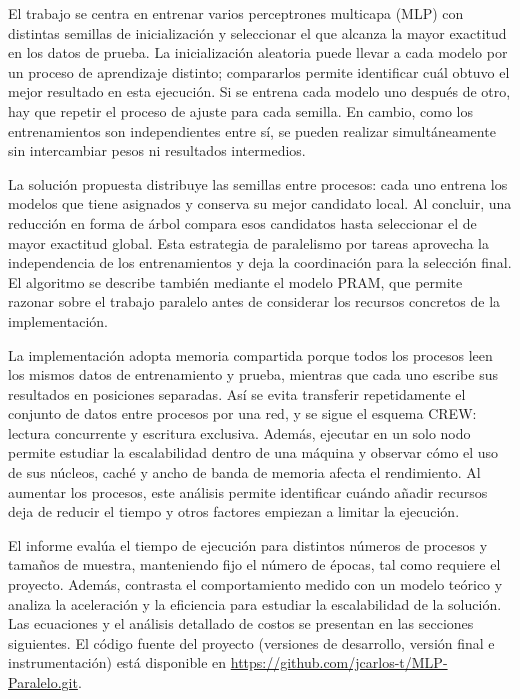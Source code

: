 \documentclass[11pt, a4paper]{article}
\begin{document}
El trabajo se centra en entrenar varios perceptrones multicapa (MLP) con distintas semillas de inicialización y seleccionar el que alcanza la mayor exactitud en los datos de prueba. La inicialización aleatoria puede llevar a cada modelo por un proceso de aprendizaje distinto; compararlos permite identificar cuál obtuvo el mejor resultado en esta ejecución. Si se entrena cada modelo uno después de otro, hay que repetir el proceso de ajuste para cada semilla. En cambio, como los entrenamientos son independientes entre sí, se pueden realizar simultáneamente sin intercambiar pesos ni resultados intermedios.

La solución propuesta distribuye las semillas entre procesos: cada uno entrena los modelos que tiene asignados y conserva su mejor candidato local. Al concluir, una reducción en forma de árbol compara esos candidatos hasta seleccionar el de mayor exactitud global. Esta estrategia de paralelismo por tareas aprovecha la independencia de los entrenamientos y deja la coordinación para la selección final. El algoritmo se describe también mediante el modelo PRAM, que permite razonar sobre el trabajo paralelo antes de considerar los recursos concretos de la implementación.

La implementación adopta memoria compartida porque todos los procesos leen los mismos datos de entrenamiento y prueba, mientras que cada uno escribe sus resultados en posiciones separadas. Así se evita transferir repetidamente el conjunto de datos entre procesos por una red, y se sigue el esquema CREW: lectura concurrente y escritura exclusiva. Además, ejecutar en un solo nodo permite estudiar la escalabilidad dentro de una máquina y observar cómo el uso de sus núcleos, caché y ancho de banda de memoria afecta el rendimiento. Al aumentar los procesos, este análisis permite identificar cuándo añadir recursos deja de reducir el tiempo y otros factores empiezan a limitar la ejecución.

El informe evalúa el tiempo de ejecución para distintos números de procesos y tamaños de muestra, manteniendo fijo el número de épocas, tal como requiere el proyecto. Además, contrasta el comportamiento medido con un modelo teórico y analiza la aceleración y la eficiencia para estudiar la escalabilidad de la solución. Las ecuaciones y el análisis detallado de costos se presentan en las secciones siguientes. El código fuente del proyecto (versiones de desarrollo, versión final e instrumentación) está disponible en \url{https://github.com/jcarlos-t/MLP-Paralelo.git}.
\end{document}
